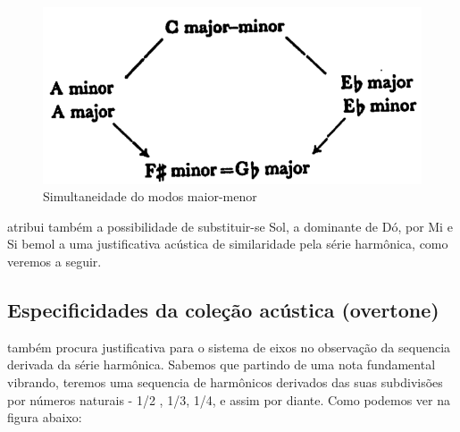 \documentclass[
	12pt,				%
	openright,			%
	twoside,			%
	a4paper,			%
	english,			%
	french,				%
	spanish,			%
	brazil				%
	]{abntex2}
\begin{document}
\begin{figure}[!h]
	\caption{\label{fig_grafico}Simultaneidade do modos maior-menor }
	\begin{center}
	    \includegraphics[scale=0.3]{axis/maiormenor.png}
	\end{center}
\end{figure}

 atribui também a possibilidade de substituir-se Sol, a dominante de Dó, por Mi e Si bemol a uma justificativa acústica de similaridade pela série harmônica, como veremos a seguir. 



\subsection{Especificidades da coleção acústica (overtone)}

 também procura  justificativa para o sistema de eixos no observação da sequencia derivada da série harmônica. Sabemos que partindo de uma nota fundamental vibrando, teremos uma sequencia de harmônicos derivados das suas subdivisões por números naturais - 1/2 , 1/3, 1/4, e assim por diante. Como podemos ver na figura abaixo:
\end{document}
